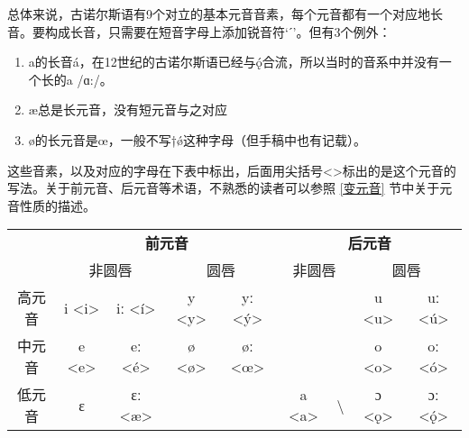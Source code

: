 总体来说，古诺尔斯语有9个对立的基本元音音素，每个元音都有一个对应地长音。要构成长音，只需要在短音字母上添加锐音符`ˊ'。但有3个例外：
\begin{info}
  \begin{enumerate}
    \item a的长音á，在12世纪的古诺尔斯语已经与ǫ́合流，所以当时的音系中并没有一个长的a /ɑ:/。
    \item æ总是长元音，没有短元音与之对应 \footnotemark
    \item ø的长元音是œ，一般不写†\'{ø}这种字母（但手稿中也有记载）。
  \end{enumerate}
\end{info}


这些音素，以及对应的字母在下表中标出，后面用尖括号<>标出的是这个元音的写法。关于前元音、后元音等术语，不熟悉的读者可以参照 \ref{变元音} 节中关于元音性质的描述。

\begin{table}[H]
  \centering
  \begin{tabular}{@{}ccccccccc@{}}
    \toprule
           & \multicolumn{4}{c}{\textbf{前元音}} & \multicolumn{4}{c}{\textbf{后元音}}                                                                                                     \\ \cmidrule(l){2-9}
           & \multicolumn{2}{c}{非圆唇}          & \multicolumn{2}{c}{圆唇}            & \multicolumn{2}{c}{非圆唇} & \multicolumn{2}{c}{圆唇}                                             \\ \cmidrule(l){2-9}
    高元音 & i <i>                               & iː <í>                              & y <y>                      & yː <ý>                   &       &                  & u <u> & uː <ú> \\
    中元音 & e <e>                               & eː <é>                              & ø <ø>                      & øː <œ>                   &       &                  & o <o> & oː <ó> \\
    低元音 & ɛ                                   & ɛː <æ>                              &                            &                          & a <a> & \textbackslash{} & ɔ <ǫ> & ɔː <ǫ́> \\ \bottomrule
  \end{tabular}
\end{table}

